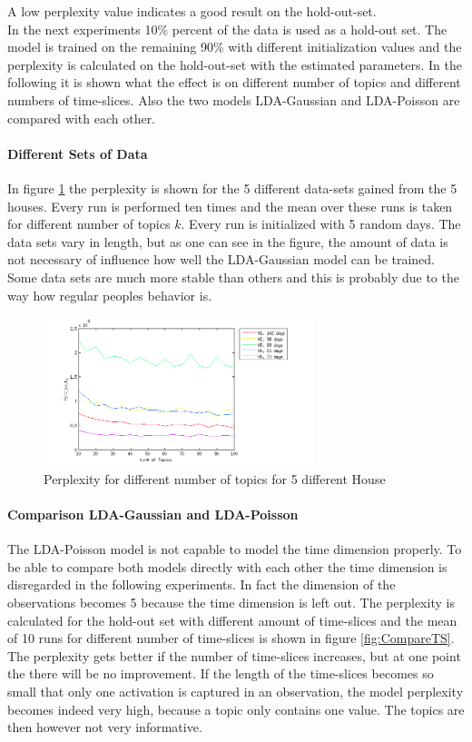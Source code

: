 A low perplexity value indicates a good result on the hold-out-set.\\

In the next experiments 10\% percent of the data is used as a hold-out set. The model is trained on the remaining 90\% with different initialization values and the perplexity is calculated on the hold-out-set with the estimated parameters. In the following it is shown what the effect is on different number of topics and different numbers of time-slices. Also the two models LDA-Gaussian and LDA-Poisson are compared with each other.

\paragraph{Different Sets of Data}
In figure \ref{fig:PerplGaus} the perplexity is shown for the 5 different data-sets gained from the 5 houses. Every run is performed ten times and the mean over these runs is taken for different number of topics $k$. Every run is initialized with 5 random days.
The data sets vary in length, but as one can see in the figure, the amount of data is not necessary of influence how well the LDA-Gaussian model can be trained. Some data sets are much more stable than others and this is probably due to the way how regular peoples behavior is.

\begin{figure}[h!]
 \centering
 \includegraphics[width=0.7\textwidth]{Pictures/PerplGaus.png}
 \caption{Perplexity for different number of topics for 5 different House}
 \label{fig:PerplGaus}
\end{figure}

\pagebreak
\paragraph{Comparison LDA-Gaussian and LDA-Poisson}
The LDA-Poisson model is not capable to model the time dimension properly. To be able to compare both models directly with each other the time dimension is disregarded in the following experiments. In fact the dimension of the observations becomes 5 because the time dimension is left out. The perplexity is calculated for the hold-out set with different amount of time-slices and the mean of 10 runs for different number of time-slices is shown in figure \ref{fig:CompareTS}. The perplexity gets better if the number of time-slices increases, but at one point the there will be no improvement. If the length of the time-slices becomes so small that only one activation is captured in an observation, the model perplexity becomes indeed very high, because a topic only contains one value. The topics are then however not very informative.\\

